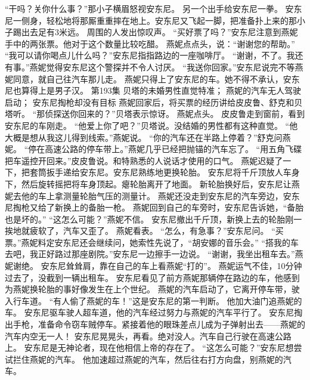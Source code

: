 \documentclass[a4paper,12pt,UTF8,twoside]{ctexbook}
\begin{document}
        “干吗？关你什么事？”那小子横眉怒视安东尼。 
        另一个出手给安东尼一拳。 
        安东尼一侧身，轻松地将那厮重重摔在地上。安东尼又飞起一脚，把准备扑上来的那小子踢出去足有3米远。 
        周围的人发出惊叹声。 
        “买好票了吗？”安东尼注意到燕妮手中的两张票。他对于这个数量比较吃醋。 
        燕妮点点头，说：“谢谢您的帮助。” 
        “我可以请你喝点儿什么吗？”安东尼指指路边的一座咖啡厅。 
        “谢谢，不了。我还有事。”燕妮觉得安东尼这个警探并不令人讨厌。 
        “我送你回家。”安东尼说完不等燕妮同意，就自己往汽车那儿走。 
        燕妮只得上了安东尼的车。她不得不承认，安东尼也算得上是男子汉。   第193集 
        贝塔的未婚男性直觉特准； 
        燕妮的汽车无人驾驶启动； 
        安东尼掏枪却没有目标   
        燕妮回家后，将买票的经历讲给皮皮鲁、舒克和贝塔听。 
        “那侦探送你回来的？”贝塔表示惊讶。 
        燕妮点头。 
        皮皮鲁走到窗前，看到安东尼的车刚走。 
        “他爱上你了吧？”贝塔说。没结婚的男性都有这种直觉。 
        “他大概是想从我这儿得到线索。”燕妮说。 
        “你的汽车还在半路上停着？”舒克问燕妮。 
        “停在高速公路的停车带上。”燕妮几乎已经把抛锚的汽车忘了。 
        “用五角飞碟把车遥控开回来。”皮皮鲁说。和特熟悉的人说话才使用的口气。 
        燕妮迟疑了一下，把套筒扳手递给安东尼。安东尼熟练地更换轮胎。 
        安东尼将千斤顶放人车身下，然后旋转摇把将车身顶起。瘪轮胎离开了地面。 
        新轮胎换好后，安东尼让燕妮去他的车上拿测量轮胎气压的测量计。 
        燕妮还没走到安东尼的汽车旁边，安东尼掏枪又给了新换上的备胎一枪。 
        燕妮回到自己的车旁时，安东尼告诉她，“备胎也是坏的。” 
        “这怎么可能？”燕妮不信。 
        安东尼撤出千斤顶，新换上去的轮胎刚一挨地就疲软了，汽车又歪了。 
        燕妮看表。 
        “怎么，有急事？”安东尼问。 
        “买票。”燕妮料定安东尼还会继续问，她索性先说了，“胡安娜的音乐会。” 
        “搭我的车去吧，我正好路过那座剧院。”安东尼一边擦手一边说。 
        “谢谢，我坐出租车去。”燕妮谢绝。 
        安东尼耸耸肩，靠在自己的车上看燕妮“打的”。 
        燕妮运气不佳，10分钟过去了，没截到一辆出租车。 
        安东尼看见了前方燕妮那辆停在路边的车，他感到为燕妮换轮胎的事好像发生在上个世纪。 
        燕妮的汽车启动了，它离开停车带，驶入行车道。 
        “有人偷了燕妮的车！”这是安东尼的第一判断。 
        他加大油门追燕妮的车。 
        安东尼驱车驶人超车道，他的汽车经过努力与燕妮的汽车平行了。 
        安东尼掏出手枪，准备命令窃车贼停车。紧接着他的眼珠差点儿成为子弹射出去——燕妮的汽车内空无一人！ 
        安东尼晃晃头，再看。绝对没人。汽车自己行驶在高速公路上。 
        安东尼是无神论者，现在他相信上帝的存在了。 
        “这怎么可能？”安东尼想尝试拦住燕妮的汽车。 
        他加速超过燕妮的汽车，然后往右打方向盘，别燕妮的汽车。 
\end{document}

